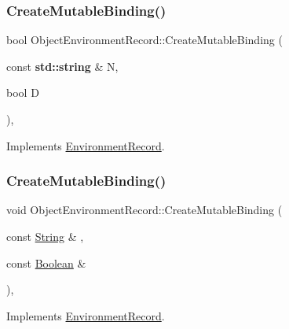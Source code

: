 \subsubsection{\texorpdfstring{Create\+Mutable\+Binding()}{CreateMutableBinding()}\hspace{0.1cm}{\footnotesize\ttfamily [1/2]}}
{\footnotesize\ttfamily bool Object\+Environment\+Record\+::\+Create\+Mutable\+Binding (\begin{DoxyParamCaption}\item[{const \textbf{ std\+::string} \&}]{N,  }\item[{bool}]{D }\end{DoxyParamCaption})\hspace{0.3cm}{\ttfamily [final]}, {\ttfamily [virtual]}}



Implements \hyperlink{struct_environment_record_af5563437dc966f3ad9bbafe951375e23}{Environment\+Record}.

\mbox{\label{struct_object_environment_record_a253c1137a60f79ea6d07ec89d04ca067}} 
\subsubsection{\texorpdfstring{Create\+Mutable\+Binding()}{CreateMutableBinding()}\hspace{0.1cm}{\footnotesize\ttfamily [2/2]}}
{\footnotesize\ttfamily void Object\+Environment\+Record\+::\+Create\+Mutable\+Binding (\begin{DoxyParamCaption}\item[{const \hyperlink{struct_string}{String} \&}]{,  }\item[{const \hyperlink{struct_boolean}{Boolean} \&}]{ }\end{DoxyParamCaption})\hspace{0.3cm}{\ttfamily [final]}, {\ttfamily [virtual]}}



Implements \hyperlink{struct_environment_record_aded45e79485e73e080980e6ff611dc0d}{Environment\+Record}.

\mbox{\label{struct_object_environment_record_a19be623695ff3da2895707cde2e014b9}} 
